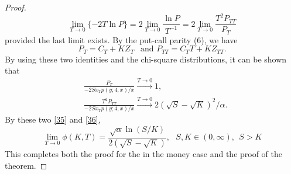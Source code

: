 \documentclass[a4 paper, 12pt]{report}
\theoremstyle{plain}
\begin{document}
\begin{proof}
\begin{equation}\label{36}
\lim_{T\rightarrow 0}\{-2T\ln P\} = 2\lim_{T\rightarrow 0}\frac{\ln P}{T^{-1}} = 2\lim_{T\rightarrow 0}\frac{T^2P_{TT}}{P_T}
\end{equation}
provided the last limit exists. By the put-call parity (6), we have
$$
P_T = C_T+KZ_T~~\mbox{  and  } P_{TT} = C_TT+KZ_{TT}.
$$
By using these two identities and the chi-square distributions, it can be shown that
\begin{align*}
&\frac{P_T}{-2Sx_Tp(y;4,x)/x}\stackrel{T\rightarrow 0}{\longrightarrow}1,\\
&\frac{T^2P_{TT}}{-2Sx_Tp(y;4,x)/x}\stackrel{T\rightarrow 0}{\longrightarrow} 2(\sqrt{S} - \sqrt{K})^2/\alpha.
\end{align*}
By these two \eqref{35} and \eqref{36},
$$
\lim_{T\rightarrow 0}\phi(K,T) = \frac{\sqrt{\alpha}\ln(S/K)}{2(\sqrt{S} - \sqrt{K})},~~~S,K\in(0,\infty),~~S>K
$$
This completes both the proof for the in the money case and the proof of the theorem.
\end{proof}
\end{document}

